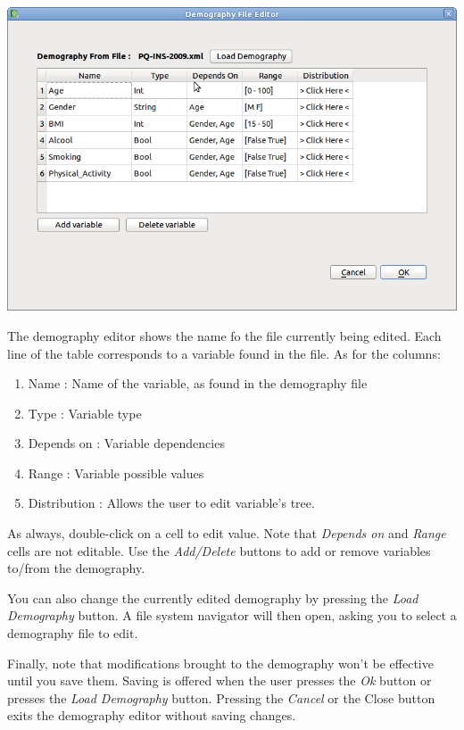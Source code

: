 \documentclass[a4paper,11pt]{report}
\begin{document}
\begin{center}
\includegraphics[scale=0.3]{Pictures/Menu/DemoEditor.png}
\label{fig:demoEditor}
\end{center}

The demography editor shows the name fo the file currently being edited. Each line of the table corresponds to a variable found in the file. As for the columns: 
\begin{enumerate}
\item{Name : } Name of the variable, as found in the demography file
\item{Type : } Variable type
\item{Depends on : } Variable dependencies
\item{Range : } Variable possible values
\item{Distribution : } Allows the user to edit variable's tree.
\end{enumerate}

As always, double-click on a cell to edit value. Note that \emph{Depends on} and \emph{Range} cells are not editable. Use the \emph{Add/Delete} buttons to add or remove variables to/from the demography.

You can also change the currently edited demography by pressing the \emph{Load Demography} button. A file system navigator will then open, asking you to select a demography file to edit.

Finally, note that modifications brought to the demography won't be effective until you save them. Saving is offered when the user presses the \emph{Ok} button or presses the \emph{Load Demography} button.
 Pressing the \emph{Cancel} or the Close button exits the demography editor without saving changes.
\end{document}
